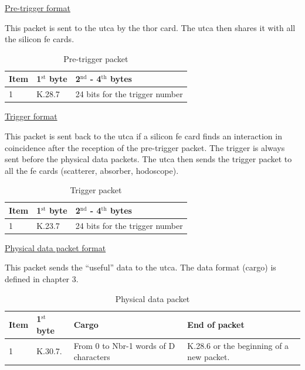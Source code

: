 \underline{Pre-trigger format\newline}

This packet is sent to the \gls{utca} by the \gls{thor} card. The \gls{utca} then shares it with all the silicon \gls{fe} cards.\newline

\begin{table} [!htbp]
\centering
\caption{Pre-trigger packet}
\label{chapappA::tab::preTrigPacket}
\begin{tabular}{m{} M{3cm} M{5cm}}
\toprule
{}
\textbf{Item}  			& 	\textbf{1$\mathrm{^{st}}$ byte}	& \textbf{2$\mathrm{^{nd}}$ - 4$\mathrm{^{th}}$ bytes}\\
			& K.28.7	&	24 bits for the trigger number\\
\bottomrule
\end{tabular}
\end{table}

\underline{Trigger format\newline}

This packet is sent back to the \gls{utca} if a silicon \gls{fe} card finds an interaction in coincidence after the reception of the pre-trigger packet. The trigger is always sent before the physical data packets. The  \gls{utca} then sends the trigger packet to all the \gls{fe} cards (scatterer, absorber, hodoscope).

\begin{table} [!htbp]
\centering
\caption{Trigger packet}
\label{chapappA::tab::triggerPacket}
\begin{tabular}{m{} M{3cm} M{5cm}}
\toprule
{}
\textbf{Item}  			& 	\textbf{1$\mathrm{^{st}}$ byte}	& \textbf{2$\mathrm{^{nd}}$ - 4$\mathrm{^{th}}$ bytes}\\
			& K.23.7	&	24 bits for the trigger number\\
\midrule
\end{tabular}
\end{table}

\underline{Physical data packet format\newline}

This packet sends the \enquote{useful} data to the \gls{utca}. The data format (cargo) is defined in chapter 3.

\begin{table} [!htbp]
\centering
\caption{Physical data packet}
\label{chapappA::tab::physDataPacket}
\begin{tabular}{m{} M{3cm} M{3cm} M{3cm}}
\toprule
{}
\textbf{Item}  			& 	\textbf{1$\mathrm{^{st}}$ byte}	& \textbf{Cargo} & \textbf{End of packet} \\
				&	K.30.7.		& From 0 to Nbr-1 words of D characters & K.28.6 or the beginning of a new packet.\\
\bottomrule
\end{tabular}
\end{table}

